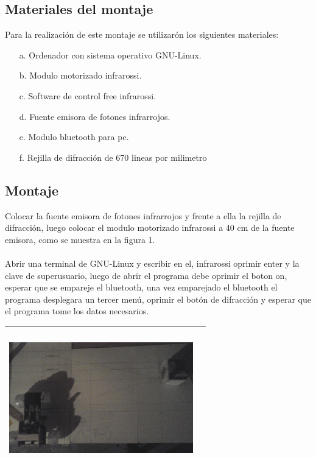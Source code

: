 \documentclass[12]{article}
\newenvironment{Figure}
{\par\medskip\noindent\minipage{\linewidth}}
{\endminipage\par\medskip}
\begin{document}
\begin{multicols}{2}
\subsection{Materiales del montaje}
Para la realización de este montaje se utilizarón los siguientes materiales:
\begin{enumerate}
\item[a.] Ordenador con sistema operativo GNU-Linux.
\item[b.] Modulo motorizado infrarossi.
\item[c.] Software de control free infrarossi.
\item[d.] Fuente emisora de fotones infrarrojos.
\item[e.] Modulo bluetooth para pc.
\item[f.] Rejilla de difracción de 670 lineas por milimetro 
\end{enumerate}

\subsection{Montaje}
Colocar la fuente emisora de fotones infrarrojos y frente a ella la rejilla de difracción, luego colocar el modulo motorizado infrarossi a 40 cm de la fuente emisora, como se muestra en la figura 1. \\ \\

Abrir una terminal de GNU-Linux y escribir en el, infrarossi oprimir enter y la clave de superusuario, luego de abrir el programa debe oprimir el boton on, esperar que se empareje el bluetooth, una vez emparejado el bluetooth el programa desplegara un tercer menú, oprimir el botón de difracción y esperar que el programa tome los datos necesarios.
\begin{Figure}	
\center
\begin{tabular}{|l|r|}
\hline
\includegraphics[width=8cm, height=6cm]{img/mon_difraccion.png} \\ \hline
\end{tabular}
\label{fig:g1}
\end{Figure}


\end{multicols}
\end{document}
